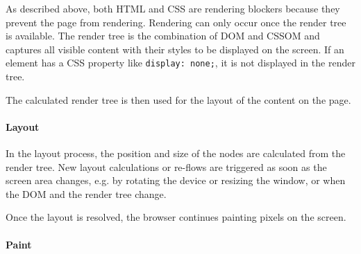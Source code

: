 As described above, both HTML and CSS are rendering blockers because they prevent the page from rendering.
Rendering can only occur once the render tree is available.
The render tree is the combination of DOM and CSSOM and captures all visible content with their styles to be displayed on the screen.
If an element has a CSS property like \verb|display: none;|, it is not displayed in the render tree. %

The calculated render tree is then used for the layout of the content on the page.





\paragraph{Layout} %

In the layout process, the position and size of the nodes are calculated from the render tree.
New layout calculations or re-flows are triggered as soon as the screen area changes, e.g. by rotating the device or resizing the window, or when the DOM and the render tree change. %

Once the layout is resolved, the browser continues painting pixels on the screen.








\paragraph{Paint} %

